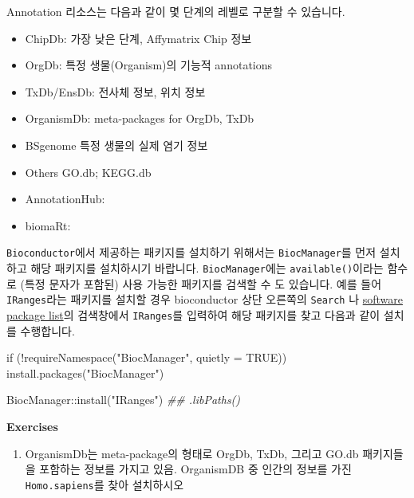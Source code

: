 \documentclass[
  a4paper,
]{book}
\newenvironment{Shaded}{\begin{snugshade}}{\end{snugshade}}
\newcommand{\AttributeTok}[1]{\textcolor[rgb]{0.40,0.45,0.13}{#1}}
\newcommand{\ConstantTok}[1]{\textcolor[rgb]{0.56,0.35,0.01}{#1}}
\newcommand{\ControlFlowTok}[1]{\textcolor[rgb]{0.00,0.23,0.31}{#1}}
\newcommand{\DocumentationTok}[1]{\textcolor[rgb]{0.37,0.37,0.37}{\textit{#1}}}
\newcommand{\FunctionTok}[1]{\textcolor[rgb]{0.28,0.35,0.67}{#1}}
\newcommand{\NormalTok}[1]{\textcolor[rgb]{0.00,0.23,0.31}{#1}}
\newcommand{\SpecialCharTok}[1]{\textcolor[rgb]{0.37,0.37,0.37}{#1}}
\newcommand{\StringTok}[1]{\textcolor[rgb]{0.13,0.47,0.30}{#1}}
\providecommand{\tightlist}{%
  \setlength{\itemsep}{0pt}\setlength{\parskip}{0pt}}\usepackage{longtable,booktabs,array}
\begin{document}
Annotation 리소스는 다음과 같이 몇 단계의 레벨로 구분할 수 있습니다.

\begin{itemize}
\tightlist
\item
  ChipDb: 가장 낮은 단계, Affymatrix Chip 정보
\item
  OrgDb: 특정 생물(Organism)의 기능적 annotations
\item
  TxDb/EnsDb: 전사체 정보, 위치 정보
\item
  OrganismDb: meta-packages for OrgDb, TxDb
\item
  BSgenome 특정 생물의 실제 염기 정보
\item
  Others GO.db; KEGG.db
\item
  AnnotationHub:
\item
  biomaRt:
\end{itemize}

\texttt{Bioconductor}에서 제공하는 패키지를 설치하기 위해서는
\texttt{BiocManager}를 먼저 설치하고 해당 패키지를 설치하시기 바랍니다.
\texttt{BiocManager}에는 \texttt{available()}이라는 함수로 (특정 문자가
포함된) 사용 가능한 패키지를 검색할 수 도 있습니다. 예를 들어
\texttt{IRanges}라는 패키지를 설치할 경우 bioconductor 상단 오른쪽의
\texttt{Search} 나
\href{https://www.bioconductor.org/packages/release/BiocViews.html\#___Software}{software
package list}의 검색창에서 \texttt{IRanges}를 입력하여 해당 패키지를
찾고 다음과 같이 설치를 수행합니다.

\begin{Shaded}
\begin{Highlighting}[]
\ControlFlowTok{if}\NormalTok{ (}\SpecialCharTok{!}\FunctionTok{requireNamespace}\NormalTok{(}\StringTok{"BiocManager"}\NormalTok{, }\AttributeTok{quietly =} \ConstantTok{TRUE}\NormalTok{))}
    \FunctionTok{install.packages}\NormalTok{(}\StringTok{"BiocManager"}\NormalTok{)}

\NormalTok{BiocManager}\SpecialCharTok{::}\FunctionTok{install}\NormalTok{(}\StringTok{"IRanges"}\NormalTok{)}
\DocumentationTok{\#\# .libPaths()}
\end{Highlighting}
\end{Shaded}

\textbf{Exercises}

\begin{enumerate}
\def\labelenumi{\arabic{enumi})}
\tightlist
\item
  OrganismDb는 meta-package의 형태로 OrgDb, TxDb, 그리고 GO.db
  패키지들을 포함하는 정보를 가지고 있음. OrganismDB 중 인간의 정보를
  가진 \texttt{Homo.sapiens}를 찾아 설치하시오
\end{enumerate}
\end{document}
